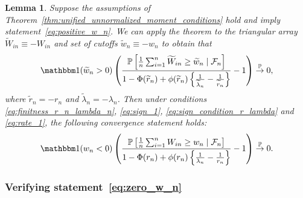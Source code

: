 \documentclass[12pt]{article}
\newtheorem{lemma}{Lemma}
\theoremstyle{definition}
\def\P{\mathbb{P}}
\def\P{\mathbb{P}}
\renewcommand{\P}{\mathbb{P}}							%
\newcommand{\indicator}{\mathbbm 1}						%
\newcommand{\convp}{\overset{\mathbb{P}}{\rightarrow}}             %
\begin{document}
\begin{lemma} \label{lem:symmetry}
Suppose the assumptions of Theorem~\ref{thm:unified_unnormalized_moment_conditions} hold and imply statement~\eqref{eq:positive_w_n}. We can apply the theorem to the triangular array $\widetilde W_{in} \equiv -W_{in}$ and set of cutoffs $\widetilde w_n \equiv -w_n$ to obtain that 
\begin{equation*}
\indicator(\widetilde w_n > 0)\left(\frac{\P\left[\frac1n \sum_{i = 1}^n \widetilde W_{in} \geq \widetilde w_n \mid \mathcal F_n\right]}{1-\Phi(\widetilde r_n)+\phi(\widetilde r_n)\left\{\frac{1}{\widetilde \lambda_n}-\frac{1}{\widetilde r_n}\right\}}-1\right) \convp 0,
\end{equation*}
where $\widetilde r_n = -r_n$ and $\widetilde \lambda_n = -\lambda_n$. Then under conditions \eqref{eq:finitness_r_n_lambda_n}, \eqref{eq:sign_1}, \eqref{eq:sign_condition_r_lambda} and \eqref{eq:rate_1}, the following convergence statement holds:
\begin{align}
\indicator(w_n < 0)\left(\frac{\P\left[\frac1n \sum_{i = 1}^n W_{in} \geq w_n \mid \mathcal F_n\right]}{1-\Phi(r_n)+\phi(r_n)\left\{\frac{1}{\lambda_n}-\frac{1}{r_n}\right\}}-1\right) \convp 0.
\end{align}
\end{lemma}

\subsubsection{Verifying statement~\eqref{eq:zero_w_n}}
\end{document}
